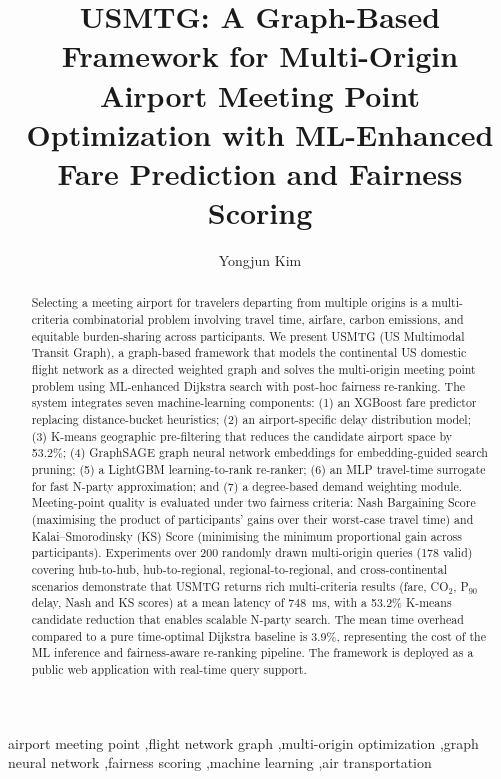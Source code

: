 \documentclass[review]{elsarticle}
\begin{document}
\begin{frontmatter}

\title{USMTG: A Graph-Based Framework for Multi-Origin Airport Meeting Point Optimization with ML-Enhanced Fare Prediction and Fairness Scoring}

\author[1]{Yongjun Kim}
\address[1]{Department of Software, Ajou University, Suwon, South Korea}

\begin{abstract}
Selecting a meeting airport for travelers departing from multiple origins is a multi-criteria combinatorial problem involving travel time, airfare, carbon emissions, and equitable burden-sharing across participants.
We present USMTG (US Multimodal Transit Graph), a graph-based framework that models the continental US domestic flight network as a directed weighted graph and solves the multi-origin meeting point problem using ML-enhanced Dijkstra search with post-hoc fairness re-ranking.
The system integrates seven machine-learning components: (1) an XGBoost fare predictor replacing distance-bucket heuristics; (2) an airport-specific delay distribution model; (3) K-means geographic pre-filtering that reduces the candidate airport space by 53.2\%; (4) GraphSAGE graph neural network embeddings for embedding-guided search pruning; (5) a LightGBM learning-to-rank re-ranker; (6) an MLP travel-time surrogate for fast N-party approximation; and (7) a degree-based demand weighting module.
Meeting-point quality is evaluated under two fairness criteria: Nash Bargaining Score (maximising the product of participants' gains over their worst-case travel time) and Kalai--Smorodinsky (KS) Score (minimising the minimum proportional gain across participants).
Experiments over 200 randomly drawn multi-origin queries (178 valid) covering hub-to-hub, hub-to-regional, regional-to-regional, and cross-continental scenarios demonstrate that USMTG returns rich multi-criteria results (fare, CO$_2$, P$_{90}$ delay, Nash and KS scores) at a mean latency of 748~ms, with a 53.2\% K-means candidate reduction that enables scalable N-party search.
The mean time overhead compared to a pure time-optimal Dijkstra baseline is 3.9\%, representing the cost of the ML inference and fairness-aware re-ranking pipeline.
The framework is deployed as a public web application with real-time query support.
\end{abstract}

\begin{keyword}
airport meeting point \sep flight network graph \sep multi-origin optimization \sep graph neural network \sep fairness scoring \sep machine learning \sep air transportation
\end{keyword}

\end{frontmatter}
\end{document}
